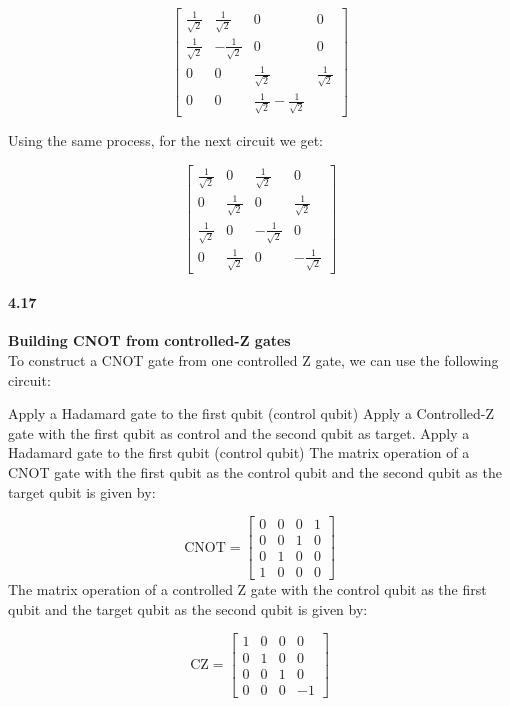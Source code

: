 $$\begin{bmatrix}\frac{1}{\sqrt{2}} & \frac{1}{\sqrt{2}} & 0 & 0 \\
\frac{1}{\sqrt{2}} & -\frac{1}{\sqrt{2}} & 0 & 0 \\
0 & 0 & \frac{1}{\sqrt{2}} & \frac{1}{\sqrt{2}} \\
0 & 0 & \frac{1}{\sqrt{2}} -\frac{1}{\sqrt{2}} \end{bmatrix}$$


Using the same process, for the next circuit we get:


$$\begin{bmatrix}\frac{1}{\sqrt{2}} & 0 & \frac{1}{\sqrt{2}} & 0\\
0 & \frac{1}{\sqrt{2}} & 0 & \frac{1}{\sqrt{2}}\\
\frac{1}{\sqrt{2}} & 0 & -\frac{1}{\sqrt{2}} & 0\\
0 & \frac{1}{\sqrt{2}}& 0 & -\frac{1}{\sqrt{2}} \end{bmatrix}$$        






\paragraph{4.17} \textbf{ Building CNOT from controlled-Z gates}
\\

To construct a CNOT gate from one controlled Z gate, we can use the following circuit:

Apply a Hadamard gate to the first qubit (control qubit)
Apply a Controlled-Z gate with the first qubit as control and the second qubit as target.
Apply a Hadamard gate to the first qubit (control qubit)
The matrix operation of a CNOT gate with the first qubit as the control qubit and the second qubit as the target qubit is given by:

$$\text{CNOT} = \begin{bmatrix}0 & 0 & 0 & 1 \\ 0 & 0 & 1 & 0 \\ 0 & 1 & 0 & 0 \\ 1 & 0 & 0 & 0\end{bmatrix}$$
The matrix operation of a controlled Z gate with the control qubit as the first qubit and the target qubit as the second qubit is given by:

$$\text{CZ} = \begin{bmatrix}1 & 0 & 0 & 0 \\ 0 & 1 & 0 & 0 \\ 0 & 0 & 1 & 0 \\ 0 & 0 & 0 & -1\end{bmatrix}$$

